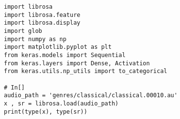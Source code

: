 \begin{verbatim}
import librosa
import librosa.feature
import librosa.display
import glob
import numpy as np
import matplotlib.pyplot as plt
from keras.models import Sequential
from keras.layers import Dense, Activation
from keras.utils.np_utils import to_categorical

# In[]
audio_path = 'genres/classical/classical.00010.au'
x , sr = librosa.load(audio_path)
print(type(x), type(sr))
\end{verbatim}